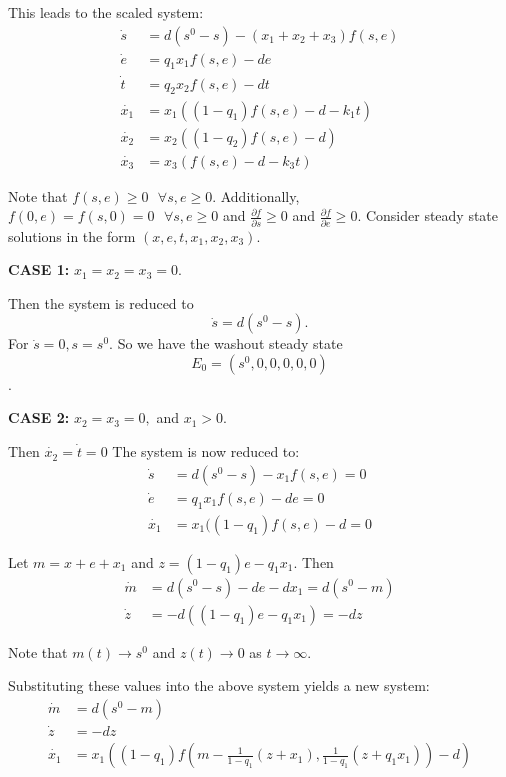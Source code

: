 \documentclass[12pt]{article}
\begin{document}
\noindent This leads to the scaled system: 
\begin{align}
\dot{s}&=d(s^0-s)-(x_1 + x_2+x_3) f(s,e) \label{fullfirst} \\
\dot{e}&=q_1 x_1 f(s,e)-de\\
\dot{t}&=q_2 x_2 f(s,e) - dt\\
\dot{x_1} &= x_1((1-q_1)f(s,e)-d- k_1 t)\\
\dot{x_2}&=x_2((1-q_2)f(s,e)-d)\\
\dot{x_3}&=x_3(f(s,e)-d-k_3 t) \label{fullfinal}
\end{align}

\noindent Note that $f(s,e) \geq 0 \text{ } \forall s,e\geq 0.$ Additionally, $f(0,e)=f(s,0)=0 \text{ }\forall s, e\geq 0$ and $\frac{\partial f}{\partial s} \geq 0$ and $\frac{\partial f}{\partial e} \geq 0$. Consider steady state solutions in the form $(x,e,t,x_1,x_2,x_3)$. 


\bigskip

\noindent \textbf{CASE 1:} $x_1=x_2=x_3=0$. 

\noindent Then the system is reduced to $$\dot{s}=d(s^0-s).$$ For $\dot{s}=0, s=s^0$. So we have the washout steady state $$E_0=(s^0,0,0,0,0,0)$$.

\noindent \textbf{CASE 2: } $x_2=x_3=0,$ and $x_1>0$. 

\noindent Then $\dot{x_2} = \dot{t} =0$ The system is now reduced to: 
\begin{align}
\dot{s}&=d(s^0-s)-x_1 f(s,e) =0\\
\dot{e}&=q_1 x_1 f(s,e) - de = 0\\
\dot{x_1}&=x_1((1-q_1)f(s,e)-d=0
\end{align}

\noindent Let $m=x+e+x_1$ and $z=(1-q_1)e-q_1 x_1$. Then
\begin{align*}
\dot{m}&=d(s^0 -s) - de - dx_1 = d(s^0-m)\\
\dot{z}&=-d((1-q_1)e-q_1 x_1) = -dz
\end{align*}

\noindent Note that $m(t) \rightarrow s^0$ and $z(t) \rightarrow 0$ as $t \rightarrow \infty$. 

\noindent Substituting these values into the above system yields a new system: 
\begin{align}
\dot{m}&=d(s^0-m) \label{mdot} \\
\dot{z}&=-dz \label{zdot} \\
\dot{x_1}&=x_1((1-q_1)f(m-\frac{1}{1-q_1} (z+x_1),\frac{1}{1-q_1}(z+q_1 x_1))-d) \label{x1dot}
\end{align}
\end{document}
